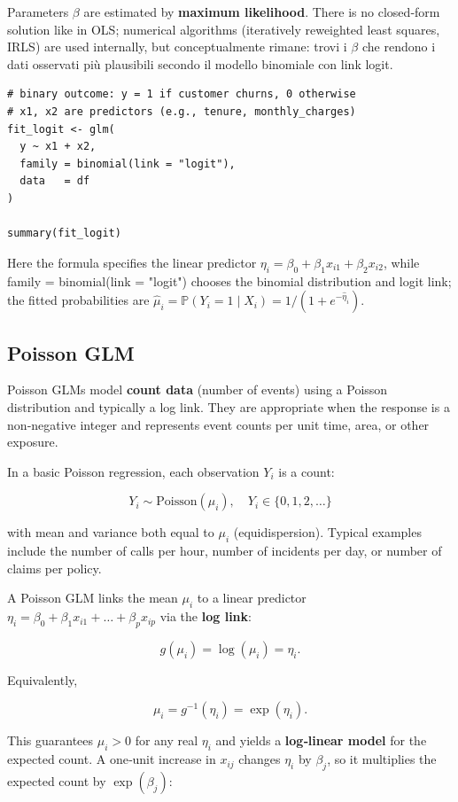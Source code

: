 Parameters $\beta$ are estimated by \textbf{maximum likelihood}. There is no closed‑form solution like in OLS; numerical algorithms (iteratively reweighted least squares, IRLS) are used internally, but conceptualmente rimane: trovi i $\beta$ che rendono i dati osservati più plausibili secondo il modello binomiale con link logit.

\begin{verbatim}
# binary outcome: y = 1 if customer churns, 0 otherwise
# x1, x2 are predictors (e.g., tenure, monthly_charges)
fit_logit <- glm(
  y ~ x1 + x2,
  family = binomial(link = "logit"),
  data   = df
)

summary(fit_logit)
\end{verbatim}

Here the formula specifies the linear predictor $\eta_i = \beta_0 + \beta_1 x_{i1} + \beta_2 x_{i2}$, while family = binomial(link = "logit") chooses the binomial distribution and logit link; the fitted probabilities are $\hat\mu_i = \mathbb{P}(Y_i = 1 \mid X_i) = 1 / (1 + e^{-\hat\eta_i})$.



\subsection{Poisson GLM}

Poisson GLMs model \textbf{count data} (number of events) using a Poisson distribution and typically a log link. They are appropriate when the response is a non‑negative integer and represents event counts per unit time, area, or other exposure.

In a basic Poisson regression, each observation $Y_i$ is a count:

\[
Y_i \sim \text{Poisson}(\mu_i), \quad Y_i \in \{0,1,2,\dots\}
\]

with mean and variance both equal to $\mu_i$ (equidispersion). Typical examples include the number of calls per hour, number of incidents per day, or number of claims per policy.



A Poisson GLM links the mean $\mu_i$ to a linear predictor $\eta_i = \beta_0 + \beta_1 x_{i1} + \dots + \beta_p x_{ip}$ via the \textbf{log link}:

\[
g(\mu_i) = \log(\mu_i) = \eta_i.
\]

Equivalently,

\[
\mu_i = g^{-1}(\eta_i) = \exp(\eta_i).
\]

This guarantees $\mu_i > 0$ for any real $\eta_i$ and yields a \textbf{log‑linear model} for the expected count. A one‑unit increase in $x_{ij}$ changes $\eta_i$ by $\beta_j$, so it multiplies the expected count by $\exp(\beta_j)$:

